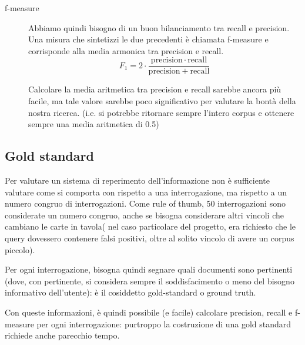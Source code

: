 \begin{description}
    \item[f-measure] Abbiamo quindi bisogno di un buon bilanciamento tra recall e precision. Una misura che sintetizzi le due precedenti è chiamata f-measure e corrisponde alla media armonica tra precision e recall. 
    \begin{equation}
        F_1 = 2 \cdot \frac{\mathrm{precision} \cdot \mathrm{recall}}{\mathrm{precision} + \mathrm{recall}}
    \end{equation}
    
    Calcolare la media aritmetica tra precision e recall sarebbe ancora più facile, ma tale valore sarebbe poco significativo per valutare la bontà della nostra ricerca. (i.e. si potrebbe ritornare sempre l'intero corpus e ottenere sempre una media aritmetica di 0.5)
\end{description}


\FloatBarrier

\subsection{Gold standard} 
Per valutare un sistema di reperimento dell’informazione non è sufficiente valutare come si comporta con rispetto a una interrogazione, ma rispetto a un numero congruo di interrogazioni.
Come rule of thumb, 50 interrogazioni sono considerate un numero congruo, anche se bisogna considerare altri vincoli che cambiano le carte in tavola( nel caso particolare del progetto, era richiesto che le query dovessero contenere falsi positivi, oltre al solito vincolo di avere un corpus piccolo).

Per ogni interrogazione, bisogna quindi segnare quali documenti sono pertinenti (dove, con pertinente, si considera sempre il soddisfacimento o meno del bisogno informativo dell’utente): è il cosiddetto \gls{gold-standard} o ground truth.

Con queste informazioni, è quindi possibile (e facile) calcolare precision, recall e f-measure per ogni interrogazione: purtroppo la costruzione di una gold standard richiede anche parecchio tempo.